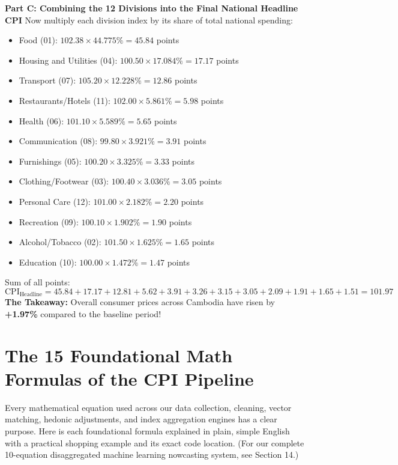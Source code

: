 \documentclass[11pt,a4paper,oneside]{article}
\begin{document}
\begin{tcolorbox}[colback=white,colframe=NavyBlue,title=\textbf{Worked Arithmetic: Calculating the Food Division and Headline CPI}]
\textbf{Part C: Combining the 12 Divisions into the Final National Headline CPI}
Now multiply each division index by its share of total national spending:
\begin{itemize}[noitemsep]
    \item Food (01): $102.38 \times 44.775\% = \mathbf{45.84}$ points
    \item Housing and Utilities (04): $100.50 \times 17.084\% = \mathbf{17.17}$ points
    \item Transport (07): $105.20 \times 12.228\% = \mathbf{12.86}$ points
    \item Restaurants/Hotels (11): $102.00 \times 5.861\% = \mathbf{5.98}$ points
    \item Health (06): $101.10 \times 5.589\% = \mathbf{5.65}$ points
    \item Communication (08): $99.80 \times 3.921\% = \mathbf{3.91}$ points
    \item Furnishings (05): $100.20 \times 3.325\% = \mathbf{3.33}$ points
    \item Clothing/Footwear (03): $100.40 \times 3.036\% = \mathbf{3.05}$ points
    \item Personal Care (12): $101.00 \times 2.182\% = \mathbf{2.20}$ points
    \item Recreation (09): $100.10 \times 1.902\% = \mathbf{1.90}$ points
    \item Alcohol/Tobacco (02): $101.50 \times 1.625\% = \mathbf{1.65}$ points
    \item Education (10): $100.00 \times 1.472\% = \mathbf{1.47}$ points
\end{itemize}
Sum of all points:
$$\text{CPI}_{\text{Headline}} = 45.84 + 17.17 + 12.81 + 5.62 + 3.91 + 3.26 + 3.15 + 3.05 + 2.09 + 1.91 + 1.65 + 1.51 = \mathbf{101.97}$$
\textbf{The Takeaway:} Overall consumer prices across Cambodia have risen by \textbf{+1.97\%} compared to the baseline period!
\end{tcolorbox}

\newpage

\section{The 15 Foundational Math Formulas of the CPI Pipeline}

Every mathematical equation used across our data collection, cleaning, vector matching, hedonic adjustments, and index aggregation engines has a clear purpose. Here is each foundational formula explained in plain, simple English with a practical shopping example and its exact code location. (For our complete 10-equation disaggregated machine learning nowcasting system, see Section 14.)
\end{document}
